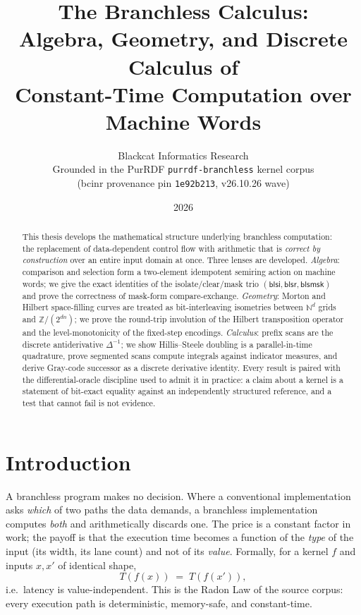 \documentclass[11pt,a4paper]{report}
\title{The Branchless Calculus:\\ Algebra, Geometry, and Discrete Calculus of\\
Constant-Time Computation over Machine Words}
\author{Blackcat Informatics Research\\[4pt]
\small Grounded in the PurRDF \texttt{purrdf-branchless} kernel corpus\\
\small (bcinr provenance pin \texttt{1e92b213}, v26.10.26 wave)}
\date{2026}
\newcommand{\Z}{\mathbb{Z}}
\newcommand{\N}{\mathbb{N}}
\begin{document}
\maketitle

\begin{abstract}
\noindent
This thesis develops the mathematical structure underlying branchless
computation: the replacement of data-dependent control flow with arithmetic
that is \emph{correct by construction} over an entire input domain at once.
Three lenses are developed. \emph{Algebra}: comparison and selection form a
two-element idempotent semiring action
on machine words; we give the exact identities of the isolate/clear/mask
trio $(\mathsf{blsi},\mathsf{blsr},\mathsf{blsmsk})$ and prove the
correctness of mask-form compare-exchange. \emph{Geometry}: Morton and
Hilbert space-filling curves are treated as bit-interleaving isometries
between $\N^d$ grids and $\Z/(2^{dn})$; we prove the round-trip involution
of the Hilbert transposition operator and the level-monotonicity of the
fixed-step encodings. \emph{Calculus}: prefix scans are the discrete
antiderivative $\Delta^{-1}$; we show Hillis--Steele doubling is a
parallel-in-time quadrature, prove segmented scans compute integrals against
indicator measures, and derive Gray-code successor as a discrete derivative
identity. Every result is paired with the differential-oracle discipline
used to admit it in practice: a claim about a kernel is a statement of
bit-exact equality against an independently structured reference, and a
test that cannot fail is not evidence.
\end{abstract}

\tableofcontents

\chapter{Introduction}

A branchless program makes no decision. Where a conventional
implementation asks \emph{which} of two paths the data demands, a
branchless implementation computes \emph{both} and arithmetically
discards one. The price is a constant factor in work; the payoff is that
the execution time becomes a function of the \emph{type} of the input
(its width, its lane count) and not of its \emph{value}. Formally, for a
kernel $f$ and inputs $x, x'$ of identical shape,
\begin{equation}
T(f(x)) \;=\; T(f(x')),
\end{equation}
i.e.\ latency is value-independent. This is the Radon Law of the source
corpus: every execution path is deterministic, memory-safe, and
constant-time.
\end{document}
